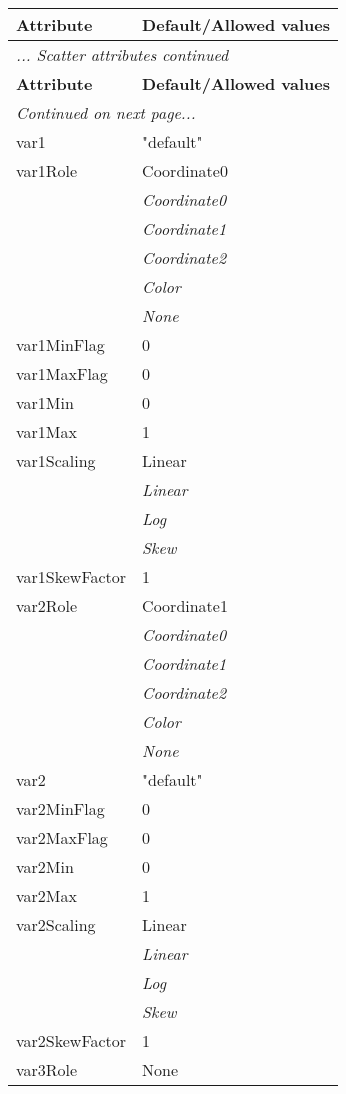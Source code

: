 \documentclass[10pt,a4paper]{report}
\begin{document}
\begin{longtable}{ll}
{\bf Attribute} & {\bf Default/Allowed values} \\
\hline \hline
\endfirsthead
\multicolumn{2}{l}{{\it ... Scatter attributes continued}} \\
{\bf Attribute} & {\bf Default/Allowed values} \\
\hline \hline
\endhead
\hline
\multicolumn{2}{l}{{\it Continued on next page...}} \\
\endfoot
\hline
\endlastfoot

var1  &  "default" \\
var1Role  &  Coordinate0   \\
 & {\it  Coordinate0} \\
 & {\it  Coordinate1} \\
 & {\it  Coordinate2} \\
 & {\it  Color} \\
 & {\it  None} \\
var1MinFlag  &  0 \\
var1MaxFlag  &  0 \\
var1Min  &  0 \\
var1Max  &  1 \\
var1Scaling  &  Linear   \\
 & {\it  Linear} \\
 & {\it  Log} \\
 & {\it  Skew} \\
var1SkewFactor  &  1 \\
var2Role  &  Coordinate1   \\
 & {\it  Coordinate0} \\
 & {\it  Coordinate1} \\
 & {\it  Coordinate2} \\
 & {\it  Color} \\
 & {\it  None} \\
var2  &  "default" \\
var2MinFlag  &  0 \\
var2MaxFlag  &  0 \\
var2Min  &  0 \\
var2Max  &  1 \\
var2Scaling  &  Linear   \\
 & {\it  Linear} \\
 & {\it  Log} \\
 & {\it  Skew} \\
var2SkewFactor  &  1 \\
var3Role  &  None   \\

\end{longtable}
\end{document}
